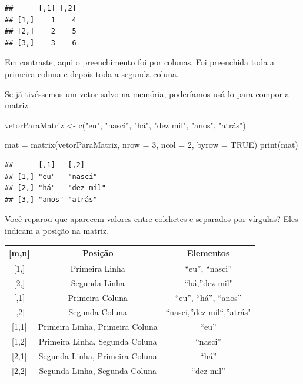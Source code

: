 \documentclass[
]{book}
\newenvironment{Shaded}{\begin{snugshade}}{\end{snugshade}}
\newcommand{\AttributeTok}[1]{\textcolor[rgb]{0.77,0.63,0.00}{#1}}
\newcommand{\ConstantTok}[1]{\textcolor[rgb]{0.00,0.00,0.00}{#1}}
\newcommand{\DecValTok}[1]{\textcolor[rgb]{0.00,0.00,0.81}{#1}}
\newcommand{\FunctionTok}[1]{\textcolor[rgb]{0.00,0.00,0.00}{#1}}
\newcommand{\NormalTok}[1]{#1}
\newcommand{\OtherTok}[1]{\textcolor[rgb]{0.56,0.35,0.01}{#1}}
\newcommand{\StringTok}[1]{\textcolor[rgb]{0.31,0.60,0.02}{#1}}
\begin{document}
\begin{verbatim}
##      [,1] [,2]
## [1,]    1    4
## [2,]    2    5
## [3,]    3    6
\end{verbatim}

Em contraste, aqui o preenchimento foi por colunas. Foi preenchida toda a primeira coluna e depois toda a segunda coluna.

Se já tivéssemos um vetor salvo na memória, poderíamos usá-lo para compor a matriz.

\begin{Shaded}
\begin{Highlighting}[]
\NormalTok{vetorParaMatriz }\OtherTok{\textless{}{-}} \FunctionTok{c}\NormalTok{(}\StringTok{"eu"}\NormalTok{, }\StringTok{"nasci"}\NormalTok{, }\StringTok{"há"}\NormalTok{, }\StringTok{"dez mil"}\NormalTok{, }\StringTok{"anos"}\NormalTok{, }\StringTok{"atrás"}\NormalTok{) }

\NormalTok{mat }\OtherTok{=} \FunctionTok{matrix}\NormalTok{(vetorParaMatriz, }\AttributeTok{nrow =} \DecValTok{3}\NormalTok{, }\AttributeTok{ncol =} \DecValTok{2}\NormalTok{, }\AttributeTok{byrow =} \ConstantTok{TRUE}\NormalTok{)}
\FunctionTok{print}\NormalTok{(mat)}
\end{Highlighting}
\end{Shaded}

\begin{verbatim}
##      [,1]   [,2]     
## [1,] "eu"   "nasci"  
## [2,] "há"   "dez mil"
## [3,] "anos" "atrás"
\end{verbatim}

Você reparou que aparecem valores entre colchetes e separados por vírgulas? Eles indicam a posição na matriz.

\begin{longtable}[]{@{}ccc@{}}
\toprule
{[}m,n{]} & Posição & Elementos \\
\midrule
\endhead
{[}1,{]} & Primeira Linha & ``eu'', ``nasci'' \\
{[}2,{]} & Segunda Linha & ``há,''dez mil" \\
{[},1{]} & Primeira Coluna & ``eu'', ``há'', ``anos'' \\
{[},2{]} & Segunda Coluna & ``nasci,''dez mil``,''atrás" \\
{[}1,1{]} & Primeira Linha, Primeira Coluna & ``eu'' \\
{[}1,2{]} & Primeira Linha, Segunda Coluna & ``nasci'' \\
{[}2,1{]} & Segunda Linha, Primeira Coluna & ``há'' \\
{[}2,2{]} & Segunda Linha, Segunda Coluna & ``dez mil'' \\
\bottomrule
\end{longtable}
\end{document}
